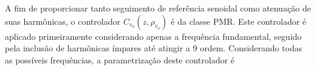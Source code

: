 \documentclass[repeatfields,oneside]{tcc}
\newcommand{\mycdot}{ \, }
\newcommand{\myvo}{ {v_o} }
\newcommand{\myC}[2][]{ C_{#1} \left( #2 \right) }
\newcommand{\myoC}[2][]{ \overline{C_{#1}} \left( #2 \right) }
\newcommand{\myCzrho}[1]{ \myC[#1]{z, \rho_{#1}} }
\begin{document}
A fim de proporcionar tanto seguimento de referência senoidal como atenuação de suas harmônicas, o controlador $\myCzrho{\myvo}$ é da classe PMR.
Este controlador é aplicado primeiramente considerando apenas a frequência fundamental, seguido pela inclusão de harmônicas ímpares até atingir a 9{\textordfeminine} ordem.
Considerando todas as possíveis frequências, a parametrização deste controlador é
\end{document}
